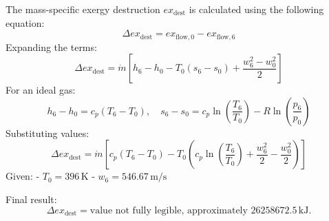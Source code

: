 The mass-specific exergy destruction \( ex_{\text{dest}} \) is calculated using the following equation:  
\[
\Delta ex_{\text{dest}} = ex_{\text{flow},0} - ex_{\text{flow},6}
\]  
Expanding the terms:  
\[
\Delta ex_{\text{dest}} = \dot{m} \left[ h_6 - h_0 - T_0 \left( s_6 - s_0 \right) + \frac{w_6^2 - w_0^2}{2} \right]
\]  
For an ideal gas:  
\[
h_6 - h_0 = c_p \left( T_6 - T_0 \right), \quad s_6 - s_0 = c_p \ln \left( \frac{T_6}{T_0} \right) - R \ln \left( \frac{p_6}{p_0} \right)
\]  
Substituting values:  
\[
\Delta ex_{\text{dest}} = \dot{m} \left[ c_p \left( T_6 - T_0 \right) - T_0 \left( c_p \ln \left( \frac{T_6}{T_0} \right) + \frac{w_6^2}{2} - \frac{w_0^2}{2} \right) \right]
\]  
Given:  
- \( T_0 = 396 \, \text{K} \)  
- \( w_6 = 546.67 \, \text{m/s} \)  

Final result:  
\[
\Delta ex_{\text{dest}} = \text{value not fully legible, approximately } 26258672.5 \, \text{kJ}.
\]